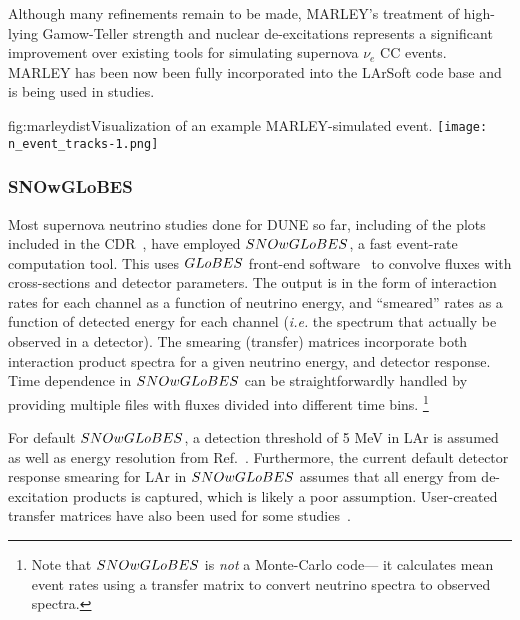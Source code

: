 Although many refinements remain to be made, MARLEY's treatment of high-lying
Gamow-Teller strength and nuclear de-excitations represents a significant
improvement over existing tools for simulating supernova $\nu_e$ CC events.  MARLEY has been now been fully incorporated into the LArSoft code base 
and is being used in studies.



\begin{dunefigure}{fig:marleydist}{Visualization of an example MARLEY-simulated event.}
\texttt{[image: n\_event\_tracks-1.png]}
\end{dunefigure}


\subsubsection{SNOwGLoBES}

Most supernova neutrino studies done for DUNE so far, including of the
plots included in the CDR~\cite{Acciarri:2015uup}, have employed
$SNOwGLoBES$\cite{sglobes}, a fast event-rate computation tool.  This
uses $GLoBES$ front-end software~\cite{Huber:2004ka,globes} to
convolve fluxes with cross-sections and detector parameters.  The
output is in the form of interaction rates for each channel as a
function of neutrino energy, and ``smeared'' rates as a function of
detected energy for each channel (\textit{i.e.} the spectrum that
actually be observed in a detector).  
The smearing (transfer) matrices incorporate both
interaction product spectra for a given neutrino energy, and detector
response. 
Time dependence in $SNOwGLoBES$ can be straightforwardly
handled by providing multiple files with fluxes divided into different
time bins. \footnote{Note that $SNOwGLoBES$ is \textit{not} a Monte-Carlo
code--- it calculates mean event rates using a transfer matrix to
convert neutrino spectra to observed spectra.}

For default $SNOwGLoBES$, a
detection threshold of 5 MeV in LAr is assumed as well as energy resolution
from Ref.~\cite{Amoruso:2003sw}.    Furthermore, the current default detector
response smearing for LAr in $SNOwGLoBES$ assumes that all energy from
de-excitation products is captured, which is likely a poor assumption. 
User-created transfer matrices have also been used
for some studies~\cite{gleb, glebdocdb}.

